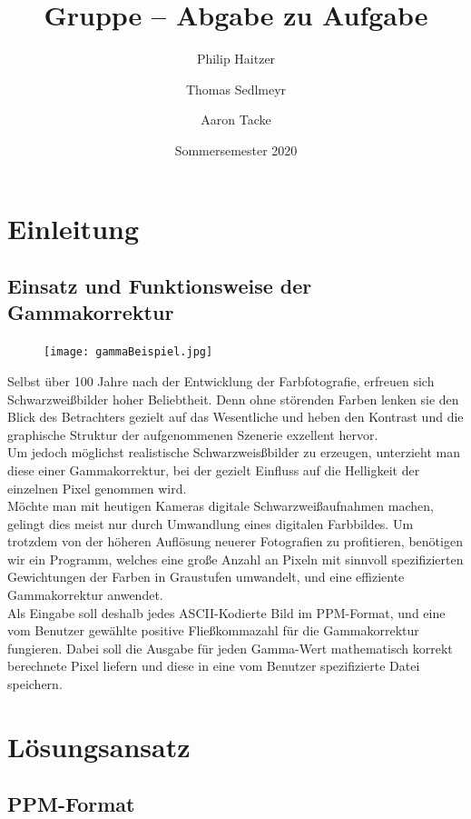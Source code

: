 \documentclass[course=erap]{aspdoc}
\author{Philip Haitzer \and Thomas Sedlmeyr \and Aaron Tacke }
\date{Sommersemester 2020} %
\title{Gruppe \theGroup{} -- Abgabe zu Aufgabe \theNumber}
\begin{document}
\maketitle

\section{Einleitung}
\subsection{Einsatz und Funktionsweise der Gammakorrektur}

\begin{figure}
	\texttt{[image: gammaBeispiel.jpg]}
\end{figure}
Selbst über 100 Jahre nach der Entwicklung der Farbfotografie, erfreuen sich Schwarzweißbilder hoher Beliebtheit. Denn ohne störenden Farben lenken sie den Blick des Betrachters gezielt auf das Wesentliche und heben den Kontrast und die graphische Struktur der aufgenommenen Szenerie exzellent hervor.\\
Um jedoch möglichst realistische Schwarzweisßbilder zu erzeugen, unterzieht man diese einer Gammakorrektur, bei der gezielt Einfluss auf die Helligkeit der einzelnen Pixel genommen wird.\\

\noindent Möchte man mit heutigen Kameras digitale Schwarzweißaufnahmen machen, gelingt dies meist nur durch Umwandlung eines digitalen Farbbildes. Um trotzdem von der höheren Auflösung neuerer Fotografien zu profitieren, benötigen wir ein Programm, welches eine große Anzahl an Pixeln mit sinnvoll spezifizierten Gewichtungen der Farben in Graustufen umwandelt, und eine effiziente Gammakorrektur anwendet.\\

\noindent Als Eingabe soll deshalb jedes ASCII-Kodierte Bild im PPM-Format, und eine vom Benutzer gewählte positive Fließkommazahl für die Gammakorrektur fungieren. Dabei soll die Ausgabe für jeden Gamma-Wert mathematisch korrekt berechnete Pixel liefern und diese in eine vom Benutzer spezifizierte Datei speichern.



\section{Lösungsansatz}
\subsection{PPM-Format}
\end{document}
